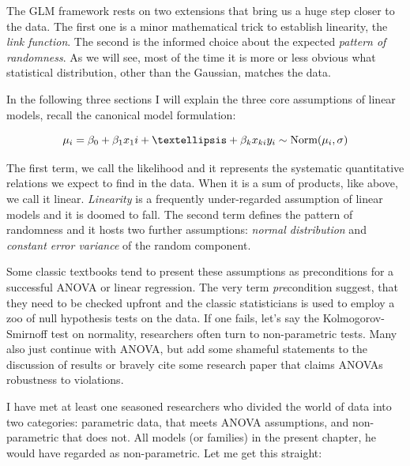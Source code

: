 \documentclass[]{svmono}
\theoremstyle{definition}
\theoremstyle{definition}
\theoremstyle{definition}
\theoremstyle{remark}
\begin{document}
The GLM framework rests on two extensions that bring us a huge step
closer to the data. The first one is a minor mathematical trick to
establish linearity, the \emph{link function}. The second is the
informed choice about the expected \emph{pattern of randomness}. As we
will see, most of the time it is more or less obvious what statistical
distribution, other than the Gaussian, matches the data.

In the following three sections I will explain the three core
assumptions of linear models, recall the canonical model formulation:

\[
\mu_i=\beta_0+ \beta_1 x_1i+ …+\beta_k x_{ki}\\
y_i \sim \textrm{Norm}(\mu_i,\sigma)
\]

The first term, we call the likelihood and it represents the systematic
quantitative relations we expect to find in the data. When it is a sum
of products, like above, we call it linear. \emph{Linearity} is a
frequently under-regarded assumption of linear models and it is doomed
to fall. The second term defines the pattern of randomness and it hosts
two further assumptions: \emph{normal distribution} and \emph{constant
error variance} of the random component.

Some classic textbooks tend to present these assumptions as
preconditions for a successful ANOVA or linear regression. The very term
\emph{pre}condition suggest, that they need to be checked upfront and
the classic statisticians is used to employ a zoo of null hypothesis
tests on the data. If one fails, let's say the Kolmogorov-Smirnoff test
on normality, researchers often turn to non-parametric tests. Many also
just continue with ANOVA, but add some shameful statements to the
discussion of results or bravely cite some research paper that claims
ANOVAs robustness to violations.

I have met at least one seasoned researchers who divided the world of
data into two categories: parametric data, that meets ANOVA assumptions,
and non-parametric that does not. All models (or families) in the
present chapter, he would have regarded as non-parametric. Let me get
this straight:
\end{document}
